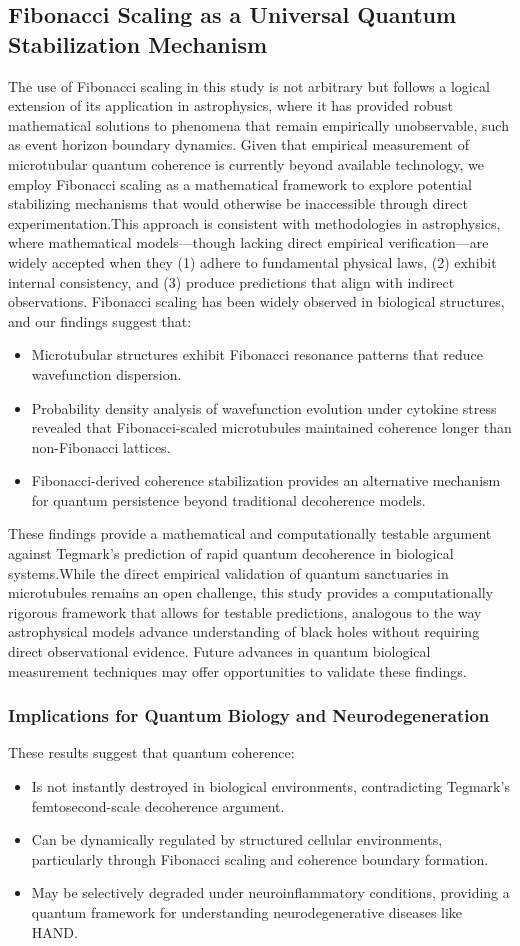 \subsection{Fibonacci Scaling as a Universal Quantum Stabilization Mechanism}
The use of Fibonacci scaling in this study is not arbitrary but follows a logical extension of its application in astrophysics, where it has provided robust mathematical solutions to phenomena that remain empirically unobservable, such as event horizon boundary dynamics. Given that empirical measurement of microtubular quantum coherence is currently beyond available technology, we employ Fibonacci scaling as a mathematical framework to explore potential stabilizing mechanisms that would otherwise be inaccessible through direct experimentation.This approach is consistent with methodologies in astrophysics, where mathematical models—though lacking direct empirical verification—are widely accepted when they (1) adhere to fundamental physical laws, (2) exhibit internal consistency, and (3) produce predictions that align with indirect observations. 
Fibonacci scaling has been widely observed in biological structures, and our findings suggest that:
\begin{itemize}
\item Microtubular structures exhibit Fibonacci resonance patterns that reduce wavefunction dispersion.
\item Probability density analysis of wavefunction evolution under cytokine stress revealed that Fibonacci-scaled microtubules maintained coherence longer than non-Fibonacci lattices.
\item Fibonacci-derived coherence stabilization provides an alternative mechanism for quantum persistence beyond traditional decoherence models.
\end{itemize}
These findings provide a mathematical and computationally testable argument against Tegmark’s prediction of rapid quantum decoherence in biological systems.While the direct empirical validation of quantum sanctuaries in microtubules remains an open challenge, this study provides a computationally rigorous framework that allows for testable predictions, analogous to the way astrophysical models advance understanding of black holes without requiring direct observational evidence. Future advances in quantum biological measurement techniques may offer opportunities to validate these findings.
\subsubsection{Implications for Quantum Biology and Neurodegeneration}
These results suggest that quantum coherence:
\begin{itemize}
    \item Is not instantly destroyed in biological environments, contradicting Tegmark’s femtosecond-scale decoherence argument.
    \item Can be dynamically regulated by structured cellular environments, particularly through Fibonacci scaling and coherence boundary formation.
    \item May be selectively degraded under neuroinflammatory conditions, providing a quantum framework for understanding neurodegenerative diseases like HAND.
\end{itemize}
